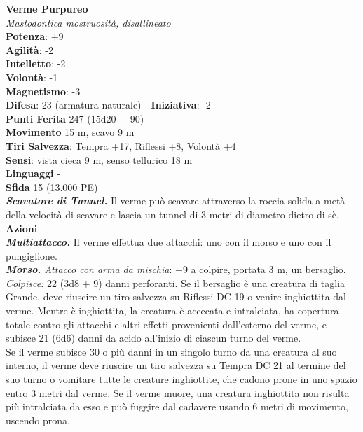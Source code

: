 \begin{multicols}{2}
\medskip\textbf{Verme Purpureo}\\
\emph{Mastodontica mostruosità, disallineato}\\
\textbf{Potenza}: +9\\
\textbf{Agilità}: -2\\
\textbf{Intelletto}: -2\\
\textbf{Volontà}: -1\\
\textbf{Magnetismo}: -3\\
\textbf{Difesa}: 23 (armatura naturale) - \textbf{Iniziativa}: -2\\
\textbf{Punti Ferita} 247 (15d20 + 90)\\
\textbf{Movimento} 15 m, scavo 9 m\\
\textbf{Tiri Salvezza}: Tempra +17, Riflessi +8, Volontà +4\\
\textbf{Sensi}: vista cieca 9 m, senso tellurico 18 m\\
\textbf{Linguaggi} -\\
\textbf{Sfida} 15 (13.000 PE)\smallskip\\
\emph{\textbf{Scavatore di Tunnel.}} Il verme può scavare attraverso la roccia solida a metà della velocità di scavare e lascia un tunnel di 3 metri di diametro dietro di sè.\\
\smallskip\textbf{Azioni}\\
\emph{\textbf{Multiattacco.}} Il verme effettua due attacchi: uno con il morso e uno con il pungiglione.\\
\emph{\textbf{Morso.} Attacco con arma da mischia}: +9 a colpire, portata 3 m, un bersaglio.\\
\emph{Colpisce:} 22 (3d8 + 9) danni perforanti. Se il bersaglio è una creatura di taglia Grande, deve riuscire un tiro salvezza su Riflessi DC 19 o venire inghiottita dal verme. Mentre è inghiottita, la creatura è accecata e intralciata, ha copertura totale contro gli attacchi e altri effetti provenienti dall'esterno del verme, e subisce 21 (6d6) danni da acido all'inizio di ciascun turno del verme.\\
Se il verme subisce 30 o più danni in un singolo turno da una creatura al suo interno, il verme deve riuscire un tiro salvezza su Tempra DC 21 al termine del suo turno o vomitare tutte le creature inghiottite, che cadono prone in uno spazio entro 3 metri dal verme. Se il verme muore, una creatura inghiottita non risulta più intralciata da esso e può fuggire dal cadavere usando 6 metri di movimento, uscendo prona.\\


\end{multicols}
